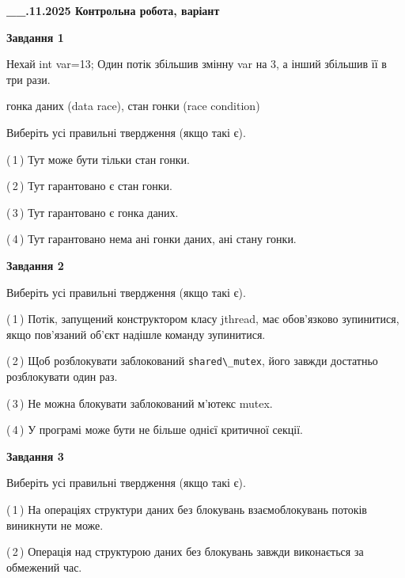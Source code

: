 \documentclass[12pt, ukrainian]{article}
\def\code#1{\Verb!#1!}
\begin{document}
\begin {large}

\textbf{\_\_.11.2025 Контрольна робота, варіант  }\par


{

\begin{center}
\textbf{Завдання 1}
\end{center}
Нехай int var=13; Один потік збільшив змінну var на 3, а інший збільшив її в три рази.

гонка даних (data race), стан гонки (race condition)

Виберіть усі правильні твердження (якщо такі є).\par
\vspace{2mm}
(\,1\,) Тут може бути тільки стан гонки.%

(\,2\,) Тут гарантовано є стан гонки.%

(\,3\,) Тут гарантовано є гонка даних.%

(\,4\,) Тут гарантовано нема ані гонки даних, ані стану гонки.%



\begin{center}
\textbf{Завдання 2}
\end{center}
Виберіть усі правильні твердження (якщо такі є).\par
\vspace{2mm}

(\,1\,) Потік, запущений конструктором класу jthread, має обов’язково зупинитися, якщо пов’язаний об’єкт надішле команду зупинитися.%

(\,2\,) Щоб розблокувати заблокований \code{shared\_mutex}, його завжди достатньо розблокувати один раз.%

(\,3\,) Не можна блокувати заблокований м’ютекс mutex.%

(\,4\,) У програмі може бути не більше однієї критичної секції.%



\begin{center}
\textbf{Завдання 3}
\end{center}
Виберіть усі правильні твердження (якщо такі є).\par
\vspace{2mm}

(\,1\,) На операціях структури даних без блокувань взаємоблокувань потоків виникнути не може.%

(\,2\,) Операція над структурою даних без блокувань завжди виконається за обмежений час.%

}
\end{large}
\end{document}
